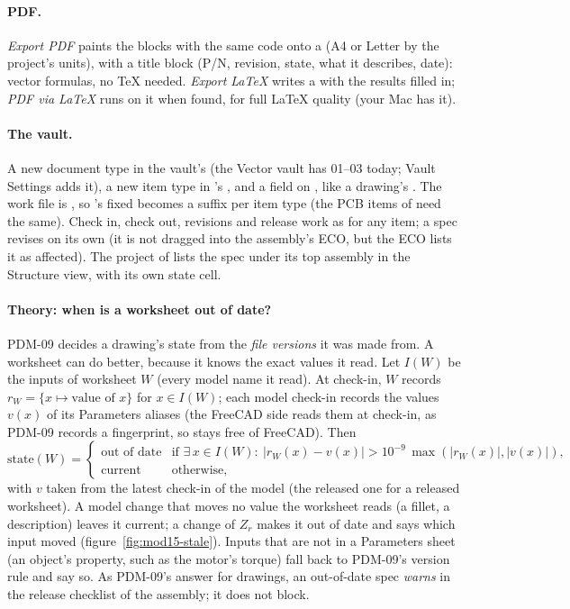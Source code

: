 \paragraph{PDF.} \emph{Export PDF} paints the blocks with the same code onto a  (A4 or Letter by the
project's units), with a title block (P/N, revision, state, what it describes, date): vector formulas, no TeX needed.
\emph{Export LaTeX} writes a  with the results filled in; \emph{PDF via LaTeX} runs  on it when
found, for full LaTeX quality (your Mac has it).

\paragraph{The vault.} A new document type  in the vault's  (the
Vector vault has 01--03 today; Vault Settings adds it), a new item type  in 's
, and a  field on , like a drawing's . The work
file is , so 's fixed  becomes a suffix per item
type (the PCB items of  need the same). Check in, check out, revisions and release work as for any item; a
spec revises on its own (it is not dragged into the assembly's ECO, but the ECO lists it as affected). The project of
 lists the spec under its top assembly in the Structure view, with its own state cell.

\paragraph{Theory: when is a worksheet out of date?} PDM-09 decides a drawing's state from the \emph{file versions} it was
made from. A worksheet can do better, because it knows the exact values it read. Let $I(W)$ be the inputs of worksheet
$W$ (every model name it read). At check-in, $W$ records $r_W = \{x \mapsto \text{value of } x\}$ for $x \in I(W)$; each
model check-in records the values $v(x)$ of its Parameters aliases (the FreeCAD side reads them at check-in, as PDM-09
records a fingerprint, so  stays free of FreeCAD). Then
\[
  \mathrm{state}(W) =
  \begin{cases}
    \text{out of date} & \text{if } \exists\, x \in I(W):\ |r_W(x) - v(x)| > 10^{-9}\,\max(|r_W(x)|, |v(x)|),\\
    \text{current} & \text{otherwise,}
  \end{cases}
\]
with $v$ taken from the latest check-in of the model (the released one for a released worksheet). A model change that
moves no value the worksheet reads (a fillet, a description) leaves it current; a change of $Z_r$ makes it out of date
and says which input moved (figure~\ref{fig:mod15-stale}). Inputs that are not in a Parameters sheet (an object's
property, such as the motor's torque) fall back to PDM-09's version rule and say so. As PDM-09's answer for drawings,
an out-of-date spec \emph{warns} in the release checklist of the assembly; it does not block.

